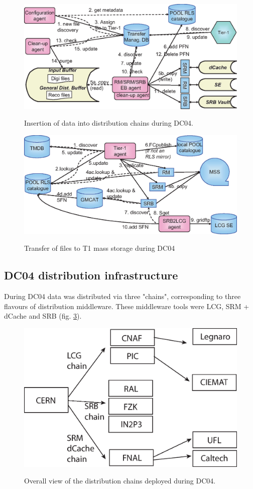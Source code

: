 \documentclass{cmspaper}
\begin{document}
\begin{figure}[tbp]
\centering
\includegraphics[angle = 90]{T0-flow-2.eps} 
\label{fig:flow2}
\caption{Insertion of data into distribution chains during DC04.}
\end{figure}

\begin{figure}[tbp]
\centering
\includegraphics[angle = 90]{T1-flow.eps} 
\label{fig:flow3}
\caption{Transfer of files to T1 mass storage during DC04}
\end{figure}

\subsection{DC04 distribution infrastructure}
During DC04 data was distributed via three "chains", corresponding to three flavours of distribution middleware. These middleware tools were LCG, SRM + dCache and SRB (fig. \ref{fig:chains}).

\begin{figure}[tbp]
\centering
\includegraphics[angle = 90]{chains.eps} 
\label{fig:chains}
\caption{Overall view of the distribution chains deployed during DC04.}
\end{figure}
\end{document}
